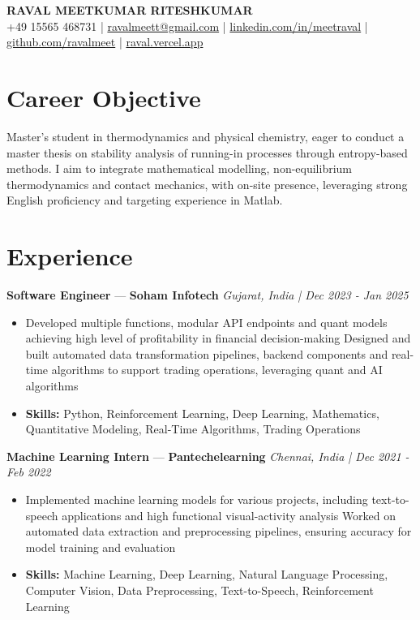 \documentclass[a4paper,10pt]{article}
\begin{document}
\begin{center}
  {\Large\bfseries RAVAL MEETKUMAR RITESHKUMAR}\\[2pt]
  {\small +49 15565 468731 \;|\; \href{mailto:ravalmeett@gmail.com}{ravalmeett@gmail.com} \;|\; \href{https://www.linkedin.com/in/meetraval/}{linkedin.com/in/meetraval} \;|\; \href{https://github.com/ravalmeet}{github.com/ravalmeet} \;|\; \href{https://raval.vercel.app/}{raval.vercel.app}}
\end{center}
\vspace{-3pt}

\section*{Career Objective}
Master's student in thermodynamics and physical chemistry, eager to conduct a master thesis on stability analysis of running-in processes through entropy-based methods. I aim to integrate mathematical modelling, non-equilibrium thermodynamics and contact mechanics, with on-site presence, leveraging strong English proficiency and targeting experience in Matlab.\par

\section*{Experience}
\textbf{Software Engineer} — \textbf{Soham Infotech} \hfill \textit{Gujarat, India \;|\; Dec 2023 - Jan 2025}\par
\vspace{1pt}
\begin{itemize}
  \item Developed multiple functions, modular API endpoints and quant models achieving high level of profitability in financial decision-making Designed and built automated data transformation pipelines, backend components and real-time algorithms to support trading operations, leveraging quant and AI algorithms
  \item \textbf{Skills:} Python, Reinforcement Learning, Deep Learning, Mathematics, Quantitative Modeling, Real-Time Algorithms, Trading Operations
\end{itemize}
\vspace{3pt}
\textbf{Machine Learning Intern} — \textbf{Pantechelearning} \hfill \textit{Chennai, India \;|\; Dec 2021 - Feb 2022}\par
\vspace{1pt}
\begin{itemize}
  \item Implemented machine learning models for various projects, including text-to-speech applications and high functional visual-activity analysis Worked on automated data extraction and preprocessing pipelines, ensuring accuracy for model training and evaluation
  \item \textbf{Skills:} Machine Learning, Deep Learning, Natural Language Processing, Computer Vision, Data Preprocessing, Text-to-Speech, Reinforcement Learning
\end{itemize}
\end{document}
